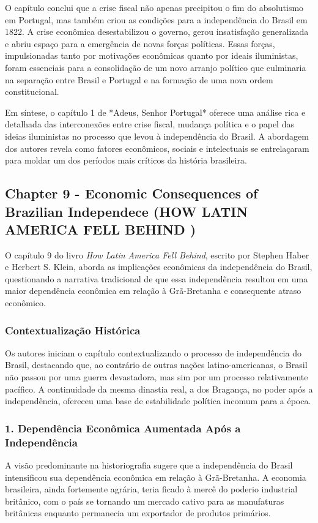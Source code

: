 \documentclass[a4paper,12pt]{article}[abntex2]
\begin{document}
O capítulo conclui que a crise fiscal não apenas precipitou o fim do absolutismo em Portugal, mas também criou as condições para a independência do Brasil em 1822. A crise econômica desestabilizou o governo, gerou insatisfação generalizada e abriu espaço para a emergência de novas forças políticas. Essas forças, impulsionadas tanto por motivações econômicas quanto por ideais iluministas, foram essenciais para a consolidação de um novo arranjo político que culminaria na separação entre Brasil e Portugal e na formação de uma nova ordem constitucional.

Em síntese, o capítulo 1 de *Adeus, Senhor Portugal* oferece uma análise rica e detalhada das interconexões entre crise fiscal, mudança política e o papel das ideias iluministas no processo que levou à independência do Brasil. A abordagem dos autores revela como fatores econômicos, sociais e intelectuais se entrelaçaram para moldar um dos períodos mais críticos da história brasileira.

\newpage
\subsection{\textbf{Chapter 9 - Economic Consequences of Brazilian Independece (HOW LATIN AMERICA FELL BEHIND )}}

O capítulo 9 do livro \textit{How Latin America Fell Behind}, escrito por Stephen Haber e Herbert S. Klein, aborda as implicações econômicas da independência do Brasil, questionando a narrativa tradicional de que essa independência resultou em uma maior dependência econômica em relação à Grã-Bretanha e consequente atraso econômico.

\subsubsection*{Contextualização Histórica}
Os autores iniciam o capítulo contextualizando o processo de independência do Brasil, destacando que, ao contrário de outras nações latino-americanas, o Brasil não passou por uma guerra devastadora, mas sim por um processo relativamente pacífico. A continuidade da mesma dinastia real, a dos Bragança, no poder após a independência, ofereceu uma base de estabilidade política incomum para a época.

\subsubsection*{1. Dependência Econômica Aumentada Após a Independência}
A visão predominante na historiografia sugere que a independência do Brasil intensificou sua dependência econômica em relação à Grã-Bretanha. A economia brasileira, ainda fortemente agrária, teria ficado à mercê do poderio industrial britânico, com o país se tornando um mercado cativo para as manufaturas britânicas enquanto permanecia um exportador de produtos primários.
\end{document}
